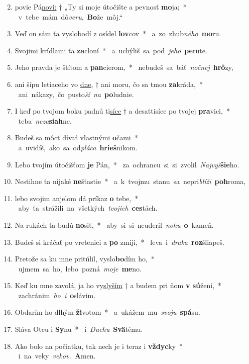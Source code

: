 \begin{flushleft}
\begin{enumerate}[leftmargin=*]
\setcounter{enumi}{1}
\item povie Pá\underline{novi:} † „Ty si moje útočište a pevnosť \textbf{mo}ja;~* \mbox{ v tebe mám dô{\it veru}, \textbf{Bo}že môj.“}
\item Veď on sám ťa vyslobodí z osídel \textbf{lov}cov~* \mbox{ a zo zhub{\it ného} \textbf{mo}ru.}
\item Svojimi krídlami ťa \textbf{za}cloní~* \mbox{ a uchýliš sa pod {\it jeho} \textbf{pe}rute.}
\item Jeho pravda je štítom a \textbf{pan}cierom,~* \mbox{ nebudeš sa báť {\it nočnej} \textbf{hrô}zy,}
\item ani šípu letiaceho vo \underline{dne,} † ani moru, čo sa tmou \textbf{za}kráda,~* \mbox{ ani nákazy, čo pusto{\it ší na} \textbf{po}ludnie.}
\item I keď po tvojom boku padnú ti\underline{síce} † a desaťtisíce po tvojej \textbf{pra}vici,~* \mbox{ teba {\it neza}\textbf{siah}ne.}
\item Budeš sa môcť dívať vlastnými \textbf{o}čami~* \mbox{ a uvidíš, ako sa od{\it pláca} \textbf{hrieš}nikom.}
\item Lebo tvojím útočišťom \textbf{je} Pán,~* \mbox{ za ochrancu si si zvolil {\it Najvyš}\textbf{šie}ho.}
\item Nestihne ťa nijaké \textbf{ne}šťastie~* \mbox{ a k tvojmu stanu sa nepri{\it blíži} \textbf{poh}roma,}
\item lebo svojim anjelom dá príkaz \textbf{o} tebe,~* \mbox{ aby ťa strážili na všetkých {\it tvojich} \textbf{ces}tách.}
\item Na rukách ťa budú \textbf{no}siť,~* \mbox{ aby si si neuderil {\it nohu} \textbf{o} kameň.}
\item Budeš si kráčať po vretenici a \textbf{po} zmiji,~* \mbox{ leva i {\it draka} \textbf{roz}šliapeš.}
\item Pretože sa ku mne pritúlil, vyslo\textbf{bo}dím ho,~* \mbox{ ujmem sa ho, lebo pozná {\it moje} \textbf{me}no.}
\item Keď ku mne zavolá, ja ho vy\underline{slyším} † a budem pri ňom \textbf{v sú}žení,~* \mbox{ zachránim {\it ho i} \textbf{o}slávim.}
\item Obdarím ho dlhým \textbf{ži}votom~* \mbox{ a ukážem mu {\it svoju} \textbf{spá}su.}
\item Sláva Otcu i \textbf{Sy}nu~* \mbox{ i {\it Duchu} \textbf{Svä}tému.}
\item Ako bolo na počiatku, tak nech je i teraz i \textbf{vždyc}ky~* \mbox{ i na veky {\it vekov.} \textbf{A}men.}\end{enumerate}
\end{flushleft}

